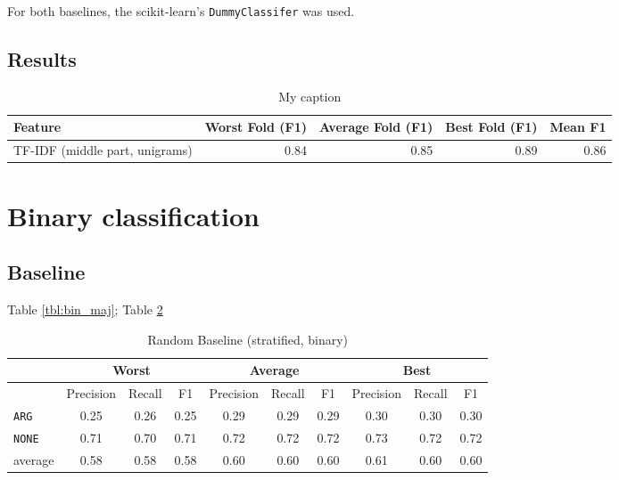 For both baselines, the scikit-learn's \texttt{DummyClassifer} was used.
\subsection{Results}

\begin{table}[h]
\centering
\caption{My caption}
\label{my-label}
\begin{tabularx}{\textwidth}{Xrrrr}
\toprule
Feature & Worst Fold (F1) & Average Fold (F1) & Best Fold (F1) & Mean F1 \\ \midrule

TF-IDF (middle part, unigrams) &	 0.84 &	 0.85&	 0.89&	0.86 \\ 
\bottomrule\end{tabularx}
\end{table}

\section{Binary classification}
\subsection{Baseline}

Table \ref{tbl:bin_maj}; Table \ref{tbl:bin_strat}

 \begin{table}[h]
                \centering
\caption{Random Baseline (stratified, binary)}
\label{tbl:bin_strat}
 \begin{tabular}{@{}lccccccccc@{}}
              \toprule
               & \multicolumn{3}{c}{Worst} & \multicolumn{3}{c}{Average} & \multicolumn{3}{c}{Best}  \\ \midrule
               & Precision  & Recall & F1   & Precision  & Recall  & F1    & Precision & Recall & F1   \\ \toprule
\texttt{ARG}	 & 0.25	 & 0.26	 & 0.25	 &0.29	 & 0.29	 & 0.29	 &0.30	 & 0.30	 & 0.30	 \\ 
\texttt{NONE}	 & 0.71	 & 0.70	 & 0.71	 &0.72	 & 0.72	 & 0.72	 &0.73	 & 0.72	 & 0.72	 \\ \midrule 
average	 & 0.58	 & 0.58	 & 0.58	 &0.60	 & 0.60	 & 0.60	 &0.61	 & 0.60	 & 0.60	 \\ \bottomrule

    \end{tabular}
\end{table}

